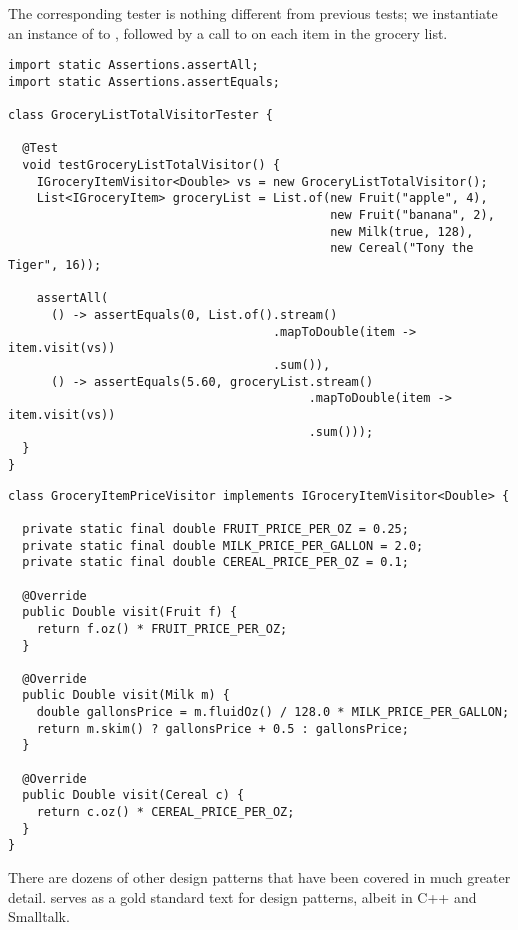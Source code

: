 The corresponding tester is nothing different from previous tests; we instantiate an instance of  to , followed by a call to  on each item in the grocery list. 

\begin{lstlisting}[language=MyJava]
import static Assertions.assertAll;
import static Assertions.assertEquals;

class GroceryListTotalVisitorTester {

  @Test
  void testGroceryListTotalVisitor() {
    IGroceryItemVisitor<Double> vs = new GroceryListTotalVisitor();
    List<IGroceryItem> groceryList = List.of(new Fruit("apple", 4),
                                             new Fruit("banana", 2),
                                             new Milk(true, 128),
                                             new Cereal("Tony the Tiger", 16));

    assertAll(
      () -> assertEquals(0, List.of().stream()
                                     .mapToDouble(item -> item.visit(vs))
                                     .sum()),
      () -> assertEquals(5.60, groceryList.stream()
                                          .mapToDouble(item -> item.visit(vs))
                                          .sum()));
  }
}
\end{lstlisting}

\begin{lstlisting}[language=MyJava]
class GroceryItemPriceVisitor implements IGroceryItemVisitor<Double> {

  private static final double FRUIT_PRICE_PER_OZ = 0.25;
  private static final double MILK_PRICE_PER_GALLON = 2.0;
  private static final double CEREAL_PRICE_PER_OZ = 0.1;

  @Override
  public Double visit(Fruit f) {
    return f.oz() * FRUIT_PRICE_PER_OZ;
  }

  @Override
  public Double visit(Milk m) {
    double gallonsPrice = m.fluidOz() / 128.0 * MILK_PRICE_PER_GALLON;
    return m.skim() ? gallonsPrice + 0.5 : gallonsPrice;
  }

  @Override
  public Double visit(Cereal c) {
    return c.oz() * CEREAL_PRICE_PER_OZ;
  }
}
\end{lstlisting}

There are dozens of other design patterns that have been covered in much greater detail.
 serves as a gold standard text for design patterns, albeit in C++ and Smalltalk.
